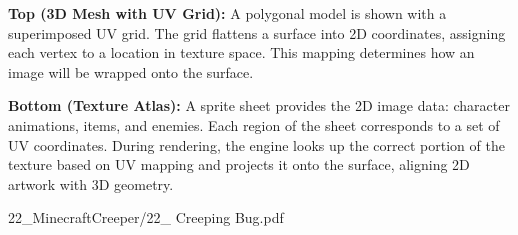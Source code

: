 \begin{SideNotePage}[1.1]{
  \textbf{Top (3D Mesh with UV Grid):} A polygonal model is shown with a superimposed UV grid. The grid flattens a surface into 2D coordinates, assigning each vertex to a location in texture space. This mapping determines how an image will be wrapped onto the surface. \par
  \textbf{Bottom (Texture Atlas):} A sprite sheet provides the 2D image data: character animations, items, and enemies. Each region of the sheet corresponds to a set of UV coordinates. During rendering, the engine looks up the correct portion of the texture based on UV mapping and projects it onto the surface, aligning 2D artwork with 3D geometry. \par

}{22_MinecraftCreeper/22_ Creeping Bug.pdf}
\end{SideNotePage}
